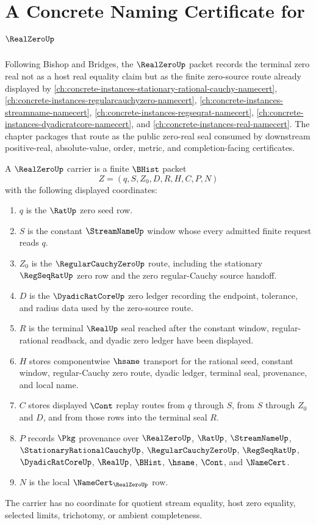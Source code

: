 \chapter{A Concrete Naming Certificate for $\RealZeroUp$}
\label{ch:concrete-instances-realzero-namecert}

Following Bishop and Bridges, the $\RealZeroUp$ packet records the terminal zero real not as a host real equality claim but as the finite zero-source route already displayed by \autoref{ch:concrete-instances-stationary-rational-cauchy-namecert}, \autoref{ch:concrete-instances-regularcauchyzero-namecert}, \autoref{ch:concrete-instances-streamname-namecert}, \autoref{ch:concrete-instances-regseqrat-namecert}, \autoref{ch:concrete-instances-dyadicratcore-namecert}, and \autoref{ch:concrete-instances-real-namecert}. The chapter packages that route as the public zero-real seal consumed by downstream positive-real, absolute-value, order, metric, and completion-facing certificates.

\begin{definition}
\label{def:real-zero-carrier}
A $\RealZeroUp$ carrier is a finite $\BHist$ packet
$$
Z=(q,S,Z_0,D,R,H,C,P,N)
$$
with the following displayed coordinates:
\begin{enumerate}
\item $q$ is the $\RatUp$ zero seed row.
\item $S$ is the constant $\StreamNameUp$ window whose every admitted finite request reads $q$.
\item $Z_0$ is the $\RegularCauchyZeroUp$ route, including the stationary $\RegSeqRatUp$ zero row and the zero regular-Cauchy source handoff.
\item $D$ is the $\DyadicRatCoreUp$ zero ledger recording the endpoint, tolerance, and radius data used by the zero-source route.
\item $R$ is the terminal $\RealUp$ seal reached after the constant window, regular-rational readback, and dyadic zero ledger have been displayed.
\item $H$ stores componentwise $\hsame$ transport for the rational seed, constant window, regular-Cauchy zero route, dyadic ledger, terminal seal, provenance, and local name.
\item $C$ stores displayed $\Cont$ replay routes from $q$ through $S$, from $S$ through $Z_0$ and $D$, and from those rows into the terminal seal $R$.
\item $P$ records $\Pkg$ provenance over $\RealZeroUp$, $\RatUp$, $\StreamNameUp$, $\StationaryRationalCauchyUp$, $\RegularCauchyZeroUp$, $\RegSeqRatUp$, $\DyadicRatCoreUp$, $\RealUp$, $\BHist$, $\hsame$, $\Cont$, and $\NameCert$.
\item $N$ is the local $\NameCert_{\RealZeroUp}$ row.
\end{enumerate}
The carrier has no coordinate for quotient stream equality, host zero equality, selected limits, trichotomy, or ambient completeness.
\end{definition}


